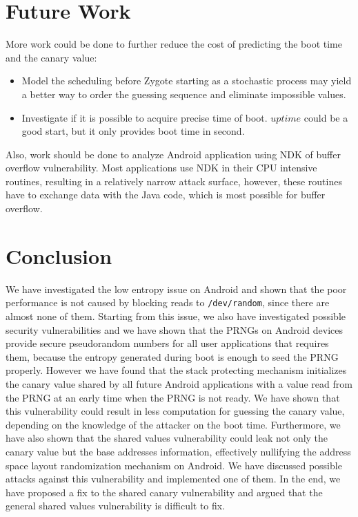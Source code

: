 \section{Future Work}
More work could be done to further reduce the cost of predicting the boot time and the canary value:

\begin{itemize}
\item Model the scheduling before Zygote starting as a stochastic process may yield a better way to order the guessing sequence and eliminate impossible values.
\item Investigate if it is possible to acquire precise time of boot. $uptime$ could be a good start, but it only provides boot time in second.

\end{itemize}

Also, work should be done to analyze Android application using NDK of buffer overflow vulnerability. Most applications use NDK in their CPU intensive routines, resulting in a relatively narrow attack surface, however, these routines have to exchange data with the Java code, which is most possible for buffer overflow.

\section{Conclusion}

We have investigated the low entropy issue on Android and shown that the poor performance is not caused by blocking reads to \verb|/dev/random|, since there are almost none of them. Starting from this issue, we also have investigated possible security vulnerabilities and we have shown that the PRNGs on Android devices provide secure pseudorandom numbers for all user applications that requires them, because the entropy generated during boot is enough to seed the PRNG properly. However we have found that the stack protecting mechanism initializes the canary value shared by all future Android applications with a value read from the PRNG at an early time when the PRNG is not ready. We have shown that this vulnerability could result in less computation for guessing the canary value, depending on the knowledge of the attacker on the boot time. Furthermore, we have also shown that the shared values vulnerability could leak not only the canary value but the base addresses information, effectively nullifying the address space layout randomization mechanism on Android. We have discussed possible attacks against this vulnerability and implemented one of them. In the end, we have proposed a fix to the shared canary vulnerability and argued that the general shared values vulnerability is difficult to fix.

